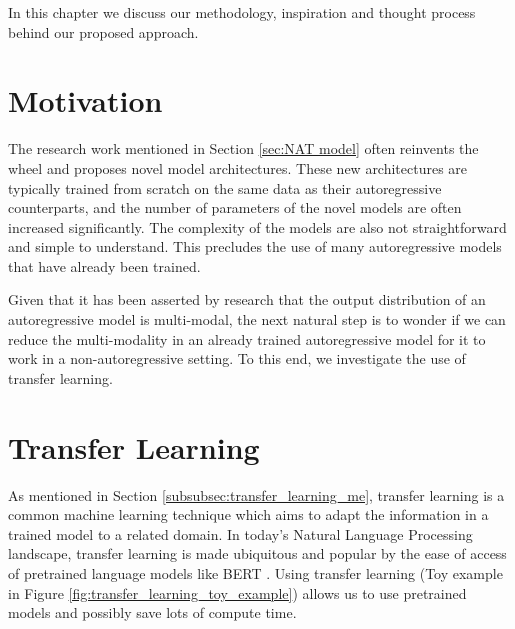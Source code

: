







In this chapter we discuss our methodology, inspiration and thought process behind our proposed approach.
\section{Motivation}
The research work mentioned in Section \ref{sec:NAT model} often reinvents the wheel and proposes novel model architectures. These new architectures are typically trained from scratch on the same data as their autoregressive counterparts, and the number of parameters of the novel models are often increased significantly. The complexity of the models are also not straightforward and simple to understand. This precludes the use of many autoregressive models that have already been trained. 

Given that it has been asserted by research \cite{gu_non-autoregressive_2018,zhou_understanding_2020} that the output distribution of an autoregressive model is multi-modal, the next natural step is to wonder if we can reduce the multi-modality in an already trained autoregressive model for it to work in a non-autoregressive setting. To this end, we investigate the use of transfer learning.



\section{Transfer Learning} \label{subsec:transfer_learning}
As mentioned in Section \ref{subsubsec:transfer_learning_me}, transfer learning \cite{zhuang_comprehensive_2020_transfer_learning} is a common machine learning technique which aims to adapt the information in a trained model to a related domain. In today's Natural Language Processing landscape, transfer learning is made ubiquitous and popular by the ease of access of pretrained language models like BERT \cite{devlin_bert_2019}. Using transfer learning (Toy example in Figure \ref{fig:transfer_learning_toy_example}) allows us to use pretrained models and possibly save lots of compute time.

